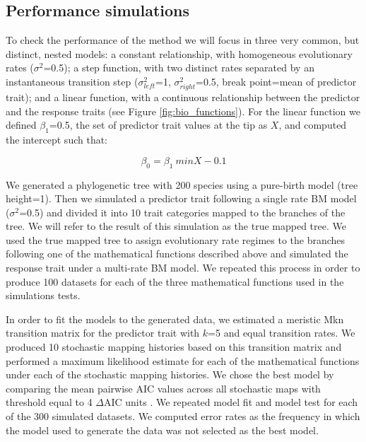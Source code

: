 \subsection{Performance simulations}

To check the performance of the method we will focus in three very common, but distinct, nested models: a constant relationship, with homogeneous evolutionary rates ($\sigma^{2}$=0.5); a step function, with two distinct rates separated by an instantaneous transition step ($\sigma^{2}_{left}$=1, $\sigma^{2}_{right}$=0.5, break point=mean of predictor trait); and a linear function, with a continuous relationship between the predictor and the response traits (see Figure \ref{fig:bio_functions}). For the linear function we defined $\beta_{1}$=0.5, the set of predictor trait values at the tip as $X$, and computed the intercept such that:

\begin{equation}
\beta_{0} = \beta_{1} \ min X - 0.1
\end{equation}

We generated a phylogenetic tree with 200 species using a pure-birth model (tree height=1). Then we simulated a predictor trait following a single rate BM model ($\sigma^{2}$=0.5) and divided it into 10 trait categories mapped to the branches of the tree. We will refer to the result of this simulation as the true mapped tree. We used the true mapped tree to assign evolutionary rate regimes to the branches following one of the mathematical functions described above and simulated the response trait under a multi-rate BM model. We repeated this process in order to produce 100 datasets for each of the three mathematical functions used in the simulations tests.

In order to fit the models to the generated data, we estimated a meristic Mkn transition matrix for the predictor trait with $\mathit{k}$=5 and equal transition rates. We produced 10 stochastic mapping histories based on this transition matrix and performed a maximum likelihood estimate for each of the mathematical functions under each of the stochastic mapping histories. We chose the best model by comparing the mean pairwise AIC values across all stochastic maps with threshold equal to 4 $\Delta$AIC units \citep{burnham_model_2003}. We repeated model fit and model test for each of the 300 simulated datasets. We computed error rates as the frequency in which the model used to generate the data was not selected as the best model.

